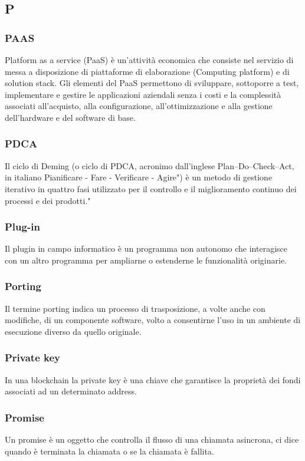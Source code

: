 \subsection*{\textbf{\hfill \Huge{P} \hfill}} 
\subsubsection*{PAAS}
Platform as a service (PaaS) è un'attività economica che consiste nel servizio di messa a disposizione di piattaforme di elaborazione (Computing platform) e di solution stack. Gli elementi del PaaS permettono di sviluppare, sottoporre a test, implementare e gestire le applicazioni aziendali senza i costi e la complessità associati all'acquisto, alla configurazione, all'ottimizzazione e alla gestione dell'hardware e del software di base.
\subsubsection*{PDCA}
Il ciclo di Deming (o ciclo di PDCA, acronimo dall'inglese Plan–Do–Check–Act, in italiano Pianificare - Fare - Verificare - Agire") è un metodo di gestione iterativo in quattro fasi utilizzato per il controllo e il miglioramento continuo dei processi e dei prodotti."
\subsubsection*{Plug-in}
Il plugin in campo informatico è un programma non autonomo che interagisce con un altro programma per ampliarne o estenderne le funzionalità originarie.
\subsubsection*{Porting}
Il termine porting indica un processo di trasposizione, a volte anche con modifiche, di un componente software, volto a consentirne l'uso in un ambiente di esecuzione diverso da quello originale.
\subsubsection*{Private key}
In una blockchain la private key è una chiave che garantisce la proprietà dei fondi associati ad un determinato address.
\subsubsection*{Promise}
Un promise è un oggetto che controlla il flusso di una chiamata asincrona, ci dice quando è terminata la chiamata o se la chiamata è fallita.
